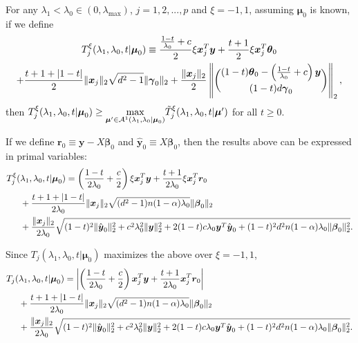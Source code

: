 \begin{theorem}
    \label{thm:2.1}
    For any $\lambda_1<\lambda_{0}\in (0,\lambda_\textrm{max})$, $j=1,2,...,p$ and $\xi=-1,1$, assuming $\boldsymbol\mu_0$ is known, if we define
    \begin{align}
        \begin{gathered}
            T^\xi_j(\lambda_1,\lambda_0,t|\boldsymbol\mu_0)\equiv\frac{\frac{1-t}{\lambda_0}+c}{2}\xi\boldsymbol x_j^T \boldsymbol y+\frac{t+1}{2}\xi \boldsymbol x_j^T \boldsymbol \theta_{0}\\+\frac{t+1+|1-t|}{2}\lVert\boldsymbol x_j\rVert_2\sqrt{d^2-1}\lVert\boldsymbol\gamma_{0}\rVert_2+\frac{\lVert\boldsymbol x_j\rVert_2}{2}\left\Vert\binom{(1-t)\boldsymbol\theta_{0}-\left(\frac{1-t}{\lambda_0}+c\right)\boldsymbol y}{(1-t)d\boldsymbol\gamma_{0}}\right\Vert_2,
        \end{gathered}
    \end{align}
    then $T^\xi_j(\lambda_1,\lambda_0,t|\boldsymbol\mu_0)\geq\underset{\boldsymbol\mu'\in\mathcal{A}^1(\lambda_1,\lambda_0|\boldsymbol\mu_0)}{\mathrm{max}}\Tilde{T}^\xi_j(\lambda_1,\lambda_0,t|\boldsymbol\mu')$ for all $t\geq0$.
\end{theorem}

If we define $\boldsymbol r_0\equiv \boldsymbol y-X\boldsymbol\beta_{0}$ and $\hat{\boldsymbol y}_{0}\equiv X\boldsymbol\beta_{0}$, then the results above can be expressed in primal variables:
\begin{align*}
    T^\xi_j(&\lambda_1,\lambda_0,t|\boldsymbol\mu_0)=  \left(\frac{1-t}{2\lambda_0}+\frac{c}{2}\right)\xi\boldsymbol x_j^T \boldsymbol y+\frac{t+1}{2\lambda_0}\xi \boldsymbol x_j^T \boldsymbol r_{0}\\
    &+\frac{t+1+|1-t|}{2\lambda_0}\lVert\boldsymbol x_j\rVert_2\sqrt{(d^2-1)n(1-\alpha) \lambda_0}\lVert\boldsymbol\beta_{0}\rVert_2\\
    &+\frac{\lVert\boldsymbol x_j\rVert_2}{2\lambda_0}\sqrt{(1-t)^2\lVert\hat{\boldsymbol y}_{0}\rVert_2^2+c^2\lambda_0^2\lVert\boldsymbol y\rVert_2^2+2(1-t)c\lambda_0 \boldsymbol y^T\hat{\boldsymbol y}_{0}+(1-t)^2d^2n(1-\alpha)\lambda_0\lVert\boldsymbol\beta_{0}\rVert_2^2}.
\end{align*}

Since $T_j(\lambda_1,\lambda_0,t|\boldsymbol\mu_0)$ maximizes the above over $\xi=-1,1$,
\begin{align}
    \label{eq:t}
    T_j(&\lambda_1,\lambda_0,t|\boldsymbol\mu_0)= \left| \left(\frac{1-t}{2\lambda_0}+\frac{c}{2}\right)\boldsymbol x_j^T \boldsymbol y+\frac{t+1}{2\lambda_0} \boldsymbol x_j^T \boldsymbol r_{0}\right|\\
    &+\frac{t+1+|1-t|}{2\lambda_0}\lVert\boldsymbol x_j\rVert_2\sqrt{(d^2-1)n(1-\alpha)\lambda_0 }\lVert\boldsymbol\beta_{0}\rVert_2\\
    &+\frac{\lVert\boldsymbol x_j\rVert_2}{2\lambda_0}\sqrt{(1-t)^2\lVert\hat{\boldsymbol y}_{0}\rVert_2^2+c^2\lambda_0^2\lVert\boldsymbol y\rVert_2^2+2(1-t)c\lambda_0 \boldsymbol y^T\hat{\boldsymbol y}_{0}+(1-t)^2d^2n(1-\alpha)\lambda_0\lVert\boldsymbol\beta_{0}\rVert_2^2}.
\end{align}

